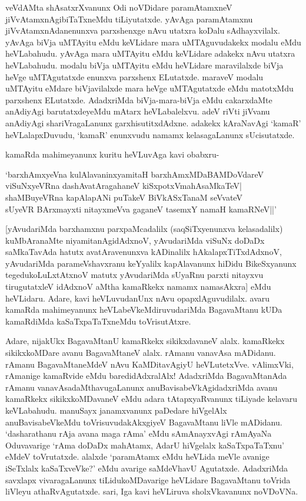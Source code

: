 veVdAMta shAsatxrXvanunx Odi noVDidare paramAtamxneV jiVvAtamxnAgibiTaTxneMdu tiLiyutatxde. yAvAga paramAtamxnu jiVvAtamxnAdanenunxva parxshenxge nAvu utatxra koDalu sAdhayxvilalx. yAvAga biVja uMTAyitu eMdu keVLidare mara uMTAguvudakekx modalu eMdu heVLabahudu. yAvAga mara uMTAyitu eMdu keVLidare adakekx nAvu utatxra heVLabahudu. modalu biVja uMTAyitu eMdu heVLidare maravilalxde biVja heVge uMTAgutatxde enunxva parxshenx ELutatxde. maraveV modalu uMTAyitu eMdare biVjavilalxde mara heVge uMTAgutatxde eMdu matotxMdu parxshenx ELutatxde. AdadxriMda biVja-mara-biVja eMdu cakarxdaMte anAdiyAgi barutatxdeyeMdu mAtarx heVLabalelxvu. adeV riVti jiVvanu anAdiyAgi shariVragaLanunx garxhisutitxdAdxne. adakekx kAraNavAgi `kamaR' heVLalapxDuvudu, `kamaR' enunxvudu namamx kelasagaLanunx sUcisutatxde.

kamaRda mahimeyanunx kuritu heVLuvAga kavi obabxru-

\begin{shloka}
`barxhAmxyeVna kulAlavaninxyamitaH barxhAmxMDaBAMDoVdareV\\
viSuNxyeVRna dashAvatAragahaneV kiSxpotxVmahAsaMkaTeV|\\
shaMBuyeVRna kapAlapANi puTakeV BiVkASxTanaM seVvateV\\
sUyeVR BArxmayxti nitayxmeVva gaganeV tasemxY namaH kamaRNeV||'
\end{shloka}

[yAvudariMda barxhamxnu parxpaMcadalilx (saqSiTxyenunxva kelasadalilx) kuMbAranaMte niyamitanAgidAdxnoV, yAvudariMda viSuNx doDaDx saMkaTavAda hatutx avatAravenunxva kADinalilx hAkalapxTiTxdAdxnoV, yAvudariMda parameVshavxranu keYyalilx kapAlavanunx hiDidu BikeSxyanunx tegedukoLuLxtAtxnoV matutx yAvudariMda sUyaRnu parxti nitayxvu tirugutatxleV idAdxnoV aMtha kamaRkekx namamx namasAkxra] eMdu heVLidaru. Adare, kavi heVLuvudanUnx nAvu opapxlAguvudilalx. avaru kamaRda mahimeyanunx heVLabeVkeMdiruvudariMda BagavaMtanu kUDa kamaRdiMda kaSaTxpaTaTxneMdu toVrisutAtxre.

Adare, nijakUkx BagavaMtanU kamaRkekx sikikxdavaneV alalx. kamaRkekx  sikikxkoMDare avanu BagavaMtaneV alalx. rAmanu vanavAsa mADidanu. rAmanu BagavaMtaneMdeV nAvu KaMDitavAgiyU heVLutetxVve. vAlimxVki, rAmanige kamaRvide eMdu baredidAdxralAlx! AdadxriMda BagavaMtanAda rAmanu vanavAsadaMthavugaLanunx anuBavisabeVkAgidadxriMda avanu kamaRkekx sikikxkoMDavaneV eMdu adara tAtapxyaRvanunx tiLiyade kelavaru keVLabahudu. manuSayx janamxvanunx paDedare hiVgelAlx anuBavisabeVkeMdu toVrisuvudakAkxgiyeV BagavaMtanu liVle mADidanu. `dasharathanu rAja avana maga rAma' eMdu sAmAnayxvAgi rAmAyaNa Oduvavarige `rAma doDaDx mahAtamx, AdarU hiVgelalx kaSaTxpaTaTxnu' eMdeV toVrutatxde. alalxde `paramAtamx eMdu heVLida meVle avanige iSeTxlalx kaSaTxveVke?' eMdu avarige saMdeVhavU Agutatxde. AdadxriMda savxlapx vivaragaLanunx tiLidukoMDavarige heVLidare BagavaMtanu toVrida liVleyu athaRvAgutatxde. sari, Iga kavi heVLiruva sholxVkavanunx noVDoVNa.

